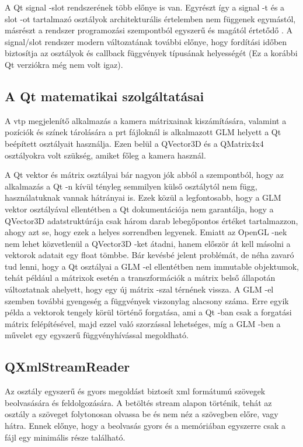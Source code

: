 A Qt signal -slot rendszerének több előnye is van. 
Egyrészt így a signal -t és a slot -ot tartalmazó osztályok 
architekturális értelemben nem függenek egymástól, 
másrészt a rendszer programozási szempontból 
egyszerű és magától értetődő \cite{qtsignalslot}. 
A signal/slot rendszer modern változatának további előnye, 
hogy fordítási időben biztosítja az osztályok és 
callback függvények típusának helyességét (Ez a korábbi Qt verziókra még nem volt igaz). 

\subsection{A Qt matematikai szolgáltatásai}

A vtp megjelenítő alkalmazás a kamera mátrixainak kiszámítására, 
valamint a pozíciók és színek tárolására a prt fájloknál is alkalmazott 
GLM helyett a Qt beépített osztályait használja. 
Ezen belül a {\ttfamily QVector3D} és a {\ttfamily QMatrix4x4}  
osztályokra volt szükség, 
amiket főleg a kamera használ.

A Qt vektor és mátrix osztályai bár nagyon jók abból a szempontból, 
hogy az alkalmazás a Qt -n kívül tényleg semmilyen külső osztálytól nem függ, 
használatuknak vannak hátrányai is. 
Ezek közül a legfontosabb, hogy a GLM vektor osztályával ellentétben 
a Qt dokumentációja nem garantálja, 
hogy a {\ttfamily QVector3D} adatstruktúrája csak 
három darab lebegőpontos értéket tartalmazzon,
ahogy azt se, hogy ezek a helyes sorrendben legyenek. 
Emiatt az OpenGL -nek nem lehet közvetlenül a {\ttfamily QVector3D} -ket átadni, 
hanem először át kell másolni a vektorok adatait egy float tömbbe. 
Bár kevésbé jelent problémát, 
de néha zavaró tud lenni, hogy a Qt osztályai a GLM -el ellentétben 
nem immutable objektumok, 
tehát például a mátrixok esetén a transzformációk 
a mátrix belső állapotán változtatnak ahelyett, 
hogy egy új mátrix -szal térnének vissza. 
A GLM -el szemben további gyengeség a függvények viszonylag alacsony száma. 
Erre egyik példa a vektorok tengely körül történő forgatása, 
ami a Qt -ban csak a forgatási mátrix felépítésével, 
majd ezzel való szorzással lehetséges, 
míg a GLM -ben a művelet egy egyszerű függvényhívással megoldható.

\subsection{QXmlStreamReader}

Az osztály egyszerű és gyors megoldást biztosít 
xml formátumú szövegek beolvasására és feldolgozására. 
A betöltés stream alapon történik, 
tehát az osztály a szöveget folytonosan olvassa be 
és nem néz a szövegben előre, vagy hátra. 
Ennek előnye, hogy a beolvasás gyors és a memóriában egyszerre 
csak a fájl egy minimális része található.

